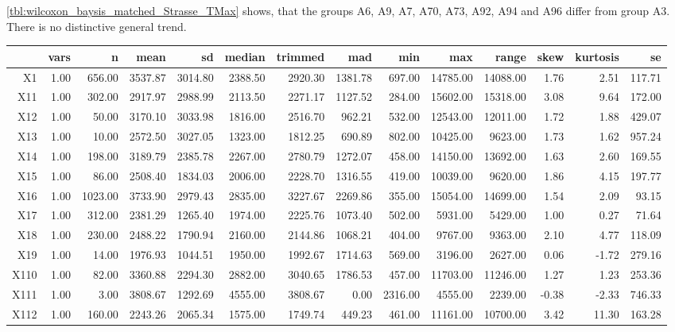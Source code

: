 \cref{tbl:wilcoxon_baysis_matched_Strasse_TMax} shows, that the groups A6, A9, A7, A70, A73, A92, A94 and A96 differ from group A3. There is no distinctive general trend.
\begin{table}[ht!]
	\tiny
	\centering
  \begin{tabular}{rrrrrrrrrrrrrr}
    \hline
   & vars & n & mean & sd & median & trimmed & mad & min & max & range & skew & kurtosis & se \\ 
    \hline
  X1 & 1.00 & 656.00 & 3537.87 & 3014.80 & 2388.50 & 2920.30 & 1381.78 & 697.00 & 14785.00 & 14088.00 & 1.76 & 2.51 & 117.71 \\ 
    X11 & 1.00 & 302.00 & 2917.97 & 2988.99 & 2113.50 & 2271.17 & 1127.52 & 284.00 & 15602.00 & 15318.00 & 3.08 & 9.64 & 172.00 \\ 
    X12 & 1.00 & 50.00 & 3170.10 & 3033.98 & 1816.00 & 2516.70 & 962.21 & 532.00 & 12543.00 & 12011.00 & 1.72 & 1.88 & 429.07 \\ 
    X13 & 1.00 & 10.00 & 2572.50 & 3027.05 & 1323.00 & 1812.25 & 690.89 & 802.00 & 10425.00 & 9623.00 & 1.73 & 1.62 & 957.24 \\ 
    X14 & 1.00 & 198.00 & 3189.79 & 2385.78 & 2267.00 & 2780.79 & 1272.07 & 458.00 & 14150.00 & 13692.00 & 1.63 & 2.60 & 169.55 \\ 
    X15 & 1.00 & 86.00 & 2508.40 & 1834.03 & 2006.00 & 2228.70 & 1316.55 & 419.00 & 10039.00 & 9620.00 & 1.86 & 4.15 & 197.77 \\ 
    X16 & 1.00 & 1023.00 & 3733.90 & 2979.43 & 2835.00 & 3227.67 & 2269.86 & 355.00 & 15054.00 & 14699.00 & 1.54 & 2.09 & 93.15 \\ 
    X17 & 1.00 & 312.00 & 2381.29 & 1265.40 & 1974.00 & 2225.76 & 1073.40 & 502.00 & 5931.00 & 5429.00 & 1.00 & 0.27 & 71.64 \\ 
    X18 & 1.00 & 230.00 & 2488.22 & 1790.94 & 2160.00 & 2144.86 & 1068.21 & 404.00 & 9767.00 & 9363.00 & 2.10 & 4.77 & 118.09 \\ 
    X19 & 1.00 & 14.00 & 1976.93 & 1044.51 & 1950.00 & 1992.67 & 1714.63 & 569.00 & 3196.00 & 2627.00 & 0.06 & -1.72 & 279.16 \\ 
    X110 & 1.00 & 82.00 & 3360.88 & 2294.30 & 2882.00 & 3040.65 & 1786.53 & 457.00 & 11703.00 & 11246.00 & 1.27 & 1.23 & 253.36 \\ 
    X111 & 1.00 & 3.00 & 3808.67 & 1292.69 & 4555.00 & 3808.67 & 0.00 & 2316.00 & 4555.00 & 2239.00 & -0.38 & -2.33 & 746.33 \\ 
    X112 & 1.00 & 160.00 & 2243.26 & 2065.34 & 1575.00 & 1749.74 & 449.23 & 461.00 & 11161.00 & 10700.00 & 3.42 & 11.30 & 163.28 \\ 

\end{tabular}
\end{table}
